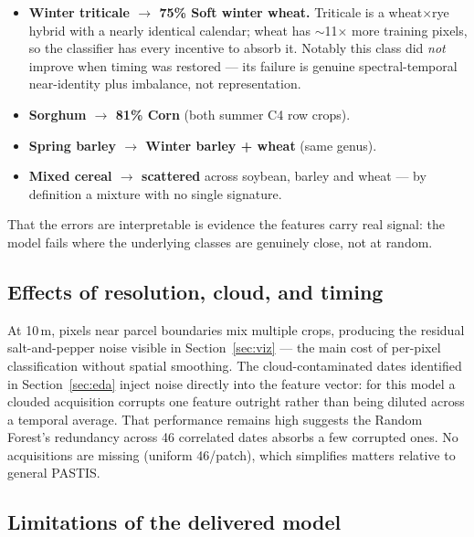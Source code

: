 \documentclass[11pt,a4paper]{article}
\begin{document}
\begin{itemize}[leftmargin=*]
  \item \textbf{Winter triticale $\rightarrow$ 75\% Soft winter wheat.}
        Triticale is a wheat$\times$rye hybrid with a nearly identical calendar;
        wheat has $\sim$11$\times$ more training pixels, so the classifier has
        every incentive to absorb it. Notably this class did \emph{not} improve
        when timing was restored --- its failure is genuine spectral-temporal
        near-identity plus imbalance, not representation.
  \item \textbf{Sorghum $\rightarrow$ 81\% Corn} (both summer C4 row crops).
  \item \textbf{Spring barley $\rightarrow$ Winter barley + wheat} (same genus).
  \item \textbf{Mixed cereal $\rightarrow$ scattered} across soybean, barley and
        wheat --- by definition a mixture with no single signature.
\end{itemize}

That the errors are interpretable is evidence the features carry real signal:
the model fails where the underlying classes are genuinely close, not at random.

\subsection{Effects of resolution, cloud, and timing}

At 10\,m, pixels near parcel boundaries mix multiple crops, producing the
residual salt-and-pepper noise visible in Section~\ref{sec:viz} --- the main
cost of per-pixel classification without spatial smoothing. The
cloud-contaminated dates identified in Section~\ref{sec:eda} inject noise
directly into the feature vector: for this model a clouded acquisition corrupts
one feature outright rather than being diluted across a temporal average. That
performance remains high suggests the Random Forest's redundancy across 46
correlated dates absorbs a few corrupted ones. No acquisitions are missing
(uniform 46/patch), which simplifies matters relative to general PASTIS.

\subsection{Limitations of the delivered model}
\end{document}
